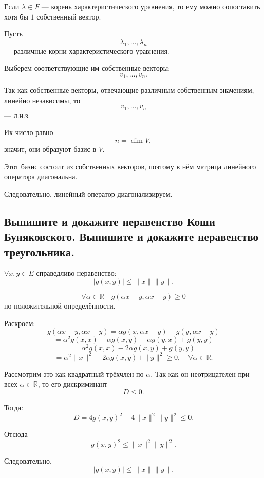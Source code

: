 \begin{Proof}
    Если $\lambda \in F$ --- корень характеристического уравнения, то ему можно сопоставить хотя бы $1$ собственный вектор.
    
    Пусть
    \[
        \lambda_1,\ldots,\lambda_n
    \]
    --- различные корни характеристического уравнения.
    
    Выберем соответствующие им собственные векторы:
    \[
        v_1,\ldots,v_n.
    \]
    
    Так как собственные векторы, отвечающие различным собственным значениям, линейно независимы, то
    \[
        v_1,\ldots,v_n
    \]
    --- л.н.з.
    
    Их число равно
    \[
        n = \dim V,
    \]
    значит, они образуют базис в $V$.
    
    Этот базис состоит из собственных векторов, поэтому в нём матрица линейного оператора диагональна.
    
    Следовательно, линейный оператор диагонализируем.
\end{Proof}
\subsection{Выпишите и докажите неравенство Коши--Буняковского. Выпишите и докажите неравенство треугольника.}

\begin{theorem}
    $\forall x,y \in E$ справедливо неравенство:
    \[
        |g(x,y)| \leq \|x\|\|y\|.
    \]
\end{theorem}

\begin{Proof}
    \[
        \forall \alpha \in \mathbb{R}\quad
        g(\alpha x-y,\alpha x-y)\geq 0
    \]
    по положительной определённости.

    Раскроем:
    \[
        g(\alpha x-y,\alpha x-y)
        =
        \alpha g(x,\alpha x-y)-g(y,\alpha x-y)
    \]
    \[
        =
        \alpha^2g(x,x)-\alpha g(x,y)-\alpha g(y,x)+g(y,y)
    \]
    \[
        =
        \alpha^2g(x,x)-2\alpha g(x,y)+g(y,y)
    \]
    \[
        =
        \alpha^2\|x\|^2-2\alpha g(x,y)+\|y\|^2 \geq 0,
        \quad \forall \alpha \in \mathbb{R}.
    \]

    Рассмотрим это как квадратный трёхчлен по $\alpha$.
    Так как он неотрицателен при всех $\alpha \in \mathbb{R}$, то его дискриминант
    \[
        D \leq 0.
    \]

    Тогда:
    \[
        D
        =
        4g(x,y)^2-4\|x\|^2\|y\|^2
        \leq 0.
    \]

    Отсюда
    \[
        g(x,y)^2 \leq \|x\|^2\|y\|^2.
    \]

    Следовательно,
    \[
        |g(x,y)| \leq \|x\|\|y\|.
    \]
\end{Proof}


